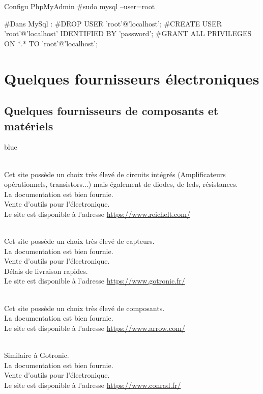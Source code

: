 {\begin{Bash}{Configu PhpMyAdmin}
#sudo mysql --user=root

#Dans MySql :
#DROP USER 'root'@'localhost';
#CREATE USER 'root'@'localhost' IDENTIFIED BY 'password';
#GRANT ALL PRIVILEGES ON *.* TO 'root'@'localhost';


\end{Bash}\chapter{Quelques fournisseurs électroniques}

  \section{Quelques fournisseurs de composants et matériels}

  \begin{items}{blue}{\Circle}
    \item {} \\ Cet site possède un choix très élevé de circuits intégrés (Amplificateurs opérationnels, transistors...) mais également de diodes, de leds, résistances.\\
    La documentation est bien fournie.\\
    Vente d'outils pour l'électronique.\\
    Le site est disponible à l'adresse \url{https://www.reichelt.com/}

    \item {} \\ Cet site possède un choix très élevé de capteurs.\\
    La documentation est bien fournie.\\
    Vente d'outils pour l'électronique.\\
    Délais de livraison rapides.\\
    Le site est disponible à l'adresse \url{https://www.gotronic.fr/}

    \item {} \\ Cet site possède un choix très élevé de composants.\\
    La documentation est bien fournie.\\
    Le site est disponible à l'adresse \url{https://www.arrow.com/}

    \item {} \\ Similaire à Gotronic.\\
    La documentation est bien fournie.\\
    Vente d'outils pour l'électronique.\\
    Le site est disponible à l'adresse \url{https://www.conrad.fr/}


\end{items}}
